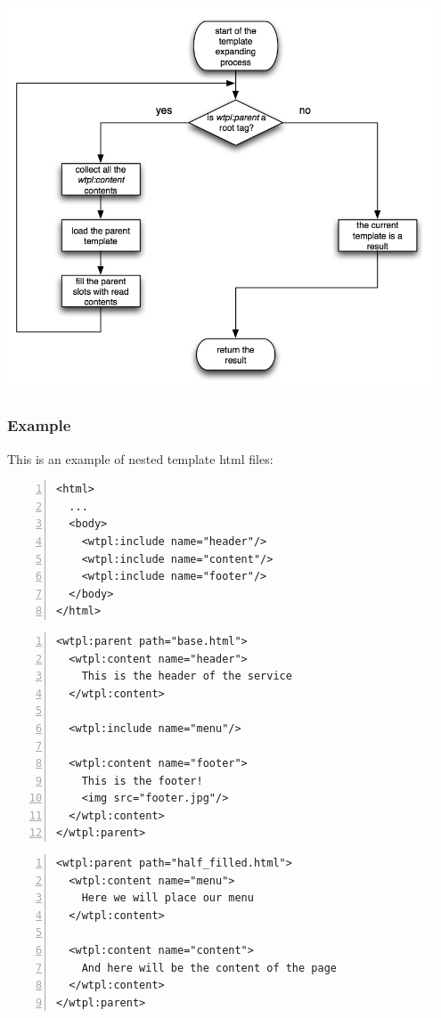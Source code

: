 \includegraphics[width=0.95\textwidth]{images/wtpl.jpg}  

\subsubsection{Example}This is an example of nested template html files:

\begin{Verbatim}[numbers=left, frame=single, label=base.html]
<html>
  ...
  <body>
    <wtpl:include name="header"/>
    <wtpl:include name="content"/>
    <wtpl:include name="footer"/>
  </body>
</html>
\end{Verbatim}

\begin{Verbatim}[numbers=left, frame=single, label=half\_filled.html]
<wtpl:parent path="base.html">
  <wtpl:content name="header">
    This is the header of the service
  </wtpl:content>

  <wtpl:include name="menu"/>

  <wtpl:content name="footer">
    This is the footer!
    <img src="footer.jpg"/>
  </wtpl:content>
</wtpl:parent>
\end{Verbatim}

\begin{Verbatim}[numbers=left, frame=single, label=filled.html]
<wtpl:parent path="half_filled.html">
  <wtpl:content name="menu">
    Here we will place our menu
  </wtpl:content>

  <wtpl:content name="content">
    And here will be the content of the page
  </wtpl:content>
</wtpl:parent>
\end{Verbatim}

